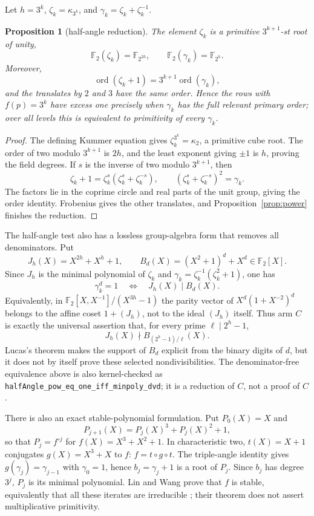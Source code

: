 \documentclass[11pt]{article}
\newtheorem{proposition}[theorem]{Proposition}
\theoremstyle{definition}
\theoremstyle{remark}
\begin{document}
Let $h=3^k$, $\zeta_k=\kappa_{3^k}$, and
$\gamma_k=\zeta_k+\zeta_k^{-1}$.

\begin{proposition}[half-angle reduction]\label{prop:c-half}
The element $\zeta_k$ is a primitive $3^{k+1}$-st root of unity,
\[
 \mathbb F_2(\zeta_k)=\mathbb F_{2^{2h}},
 \qquad
 \mathbb F_2(\gamma_k)=\mathbb F_{2^h}.
\]
Moreover,
\[
 \operatorname{ord}(\zeta_k+1)
 =3^{k+1}\operatorname{ord}(\gamma_k),
\]
and the translates by $2$ and $3$ have the same order.  Hence the rows with
$f(p)=3^k$ have excess one precisely when $\gamma_k$ has the full relevant
primary order; over all levels this is equivalent to primitivity of every
$\gamma_k$.
\end{proposition}

\begin{proof}
The defining Kummer equation gives $\zeta_k^{3^k}=\kappa_2$, a primitive
cube root.  The order of two modulo $3^{k+1}$ is $2h$, and the least exponent
giving $\pm1$ is $h$, proving the field degrees.  If $s$ is the inverse of
two modulo $3^{k+1}$, then
\[
 \zeta_k+1=\zeta_k^s(\zeta_k^s+\zeta_k^{-s}),
 \qquad
 (\zeta_k^s+\zeta_k^{-s})^2=\gamma_k.
\]
The factors lie in the coprime circle and real parts of the unit group,
giving the order identity.  Frobenius gives the other translates, and
Proposition~\ref{prop:power} finishes the reduction.
\end{proof}

The half-angle test also has a lossless group-algebra form that removes all
denominators.  Put
\[
 J_h(X)=X^{2h}+X^h+1,
 \qquad B_d(X)=(X^2+1)^d+X^d\in\mathbb F_2[X].
\]
Since $J_h$ is the minimal polynomial of $\zeta_k$ and
$\gamma_k=\zeta_k^{-1}(\zeta_k^2+1)$, one has
\begin{equation}
 \gamma_k^d=1
 \quad\Longleftrightarrow\quad
 J_h(X)\mid B_d(X).
\end{equation}
Equivalently, in
$\mathbb F_2[X,X^{-1}]/(X^{3h}-1)$ the parity vector of
$X^d(1+X^{-2})^d$ belongs to the affine coset $1+(J_h)$, not to the ideal
$(J_h)$ itself.  Thus arm $C$ is exactly the universal assertion that, for
every prime $\ell\mid 2^h-1$,
\[
 J_h(X)\nmid B_{(2^h-1)/\ell}(X).
\]
Lucas's theorem makes the support of $B_d$ explicit from the binary digits of
$d$, but it does not by itself prove these selected nondivisibilities.  The
denominator-free equivalence above is also kernel-checked as
\texttt{halfAngle\_pow\_eq\_one\_iff\_minpoly\_dvd}; it is a reduction of
$C$, not a proof of $C$.

There is also an exact stable-polynomial formulation.  Put $P_0(X)=X$ and
\[
 P_{j+1}(X)=P_j(X)^3+P_j(X)^2+1,
\]
so that $P_j=f^{\circ j}$ for $f(X)=X^3+X^2+1$.  In characteristic two,
$t(X)=X+1$ conjugates $g(X)=X^3+X$ to $f$: $f=t\circ g\circ t$.
The triple-angle identity gives $g(\gamma_j)=\gamma_{j-1}$ with
$\gamma_0=1$, hence $b_j=\gamma_j+1$ is a root of $P_j$.  Since $b_j$ has
degree $3^j$, $P_j$ is its minimal polynomial.  Lin and Wang prove that $f$
is stable, equivalently that all these iterates are irreducible
\cite{linwang2024}; their theorem does not assert multiplicative primitivity.
\end{document}
